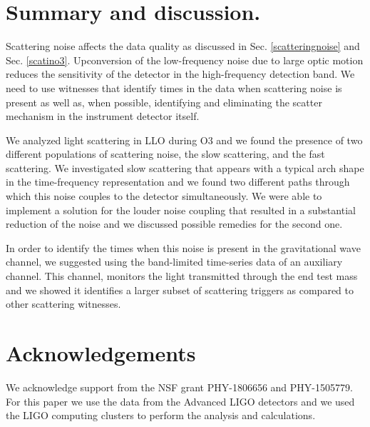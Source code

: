 \documentclass[12pt]{iopart}
\begin{document}
\newpage
\section{Summary and discussion.}\label{summary}
 Scattering noise affects the data quality as discussed in Sec. \ref{scatteringnoise} and Sec. \ref{scatino3}. Upconversion of the low-frequency noise due to large optic motion reduces the sensitivity of the detector in the high-frequency detection band. We need to use witnesses that identify times in the data when scattering noise is present as well as, when possible, identifying and eliminating the scatter mechanism in the instrument detector itself. 

We analyzed light scattering in LLO during O3 and we found the presence of two different populations of scattering noise, the slow scattering, and the fast scattering. We investigated slow scattering that appears with a typical arch shape in the time-frequency representation and we found two different paths through which this noise couples to the detector simultaneously. We were able to implement a solution for the louder noise coupling that resulted in a substantial reduction of the noise and we discussed possible remedies for the second one. 

In order to identify the times when this noise is present in the gravitational wave channel, we suggested using the band-limited time-series data of an auxiliary channel. This channel, monitors the light transmitted through the end test mass and we showed it identifies a larger subset of scattering triggers as compared to other scattering witnesses.
\par

\section{Acknowledgements} We acknowledge support from the NSF grant PHY-1806656 and PHY-1505779. For this paper we use the data from the Advanced LIGO detectors and we used the LIGO computing clusters to perform the analysis and calculations. 

  


\end{document}
